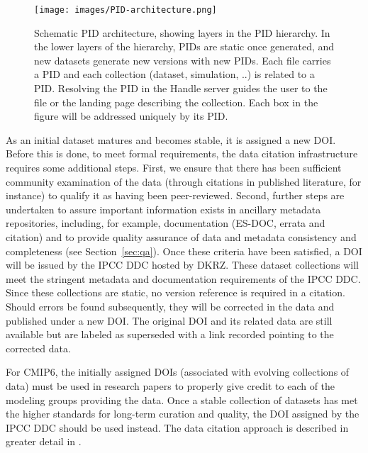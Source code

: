 \documentclass[gmd,manuscript]{copernicus}
\begin{document}
\begin{figure*}
  \begin{center}
    \texttt{[image: images/PID-architecture.png]}
  \end{center}
  \caption{Schematic PID architecture, showing layers in the PID
    hierarchy. In the lower layers of the hierarchy, PIDs are static
    once generated, and new datasets generate new versions with new
    PIDs. Each file carries a PID and each collection (dataset,
    simulation, ..) is related to a PID. Resolving the PID in the
    Handle server guides the user to the file or the landing page
    describing the collection. Each box in the figure will be
    addressed uniquely by its PID.}
  \label{fig:pidarch}
\end{figure*}

As an initial dataset matures and becomes stable, it is assigned a new
DOI. Before this is done, to meet formal requirements, the data citation infrastructure
requires some additional steps.  First, we
ensure that there has been sufficient community examination of the
data
(through citations in published literature, for instance) to qualify
it as having been peer-reviewed. Second, further steps are undertaken
to assure important information exists in ancillary metadata
repositories, including, for example, documentation (ES-DOC, errata
and citation) and to provide quality assurance of data and metadata
consistency and completeness (see Section~\ref{sec:qa}). Once these
criteria have been satisfied, a DOI will be issued by the IPCC DDC
hosted by DKRZ. These dataset collections will meet the stringent
metadata and documentation requirements of the IPCC DDC. Since these
collections are static, no version reference is required in a
citation.
Should errors be found subsequently, they will be corrected in the
data and published under a new DOI. The original DOI and its related
data are still available but are labeled as superseded with a link recorded
pointing to the corrected data.

For CMIP6, the initially assigned DOIs (associated with evolving
collections of data) must be used in research papers to properly give
credit to each of the modeling groups providing the data. Once a
stable collection of datasets has met the higher standards for
long-term curation and quality, the DOI assigned by the IPCC DDC
should be used instead.
The data citation approach is described in greater detail in \cite{ref:stockhauselautenschlager2017}.
\end{document}
